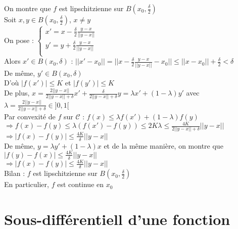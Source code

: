 \documentclass[12pt,a4paper]{article}
\begin{document}
On montre que $f$ est lipschitzienne sur $B(x_0, \frac{\delta}{2})$\\
Soit $x, y \in B(x_0, \frac{\delta}{2})$, $x \neq y$\\

On pose :
$\begin{cases}
    x' = x - \frac{\delta}{2} \frac{y - x}{||y - x||}\\
    y' = y + \frac{\delta}{2} \frac{y - x}{||y - x||}\\
\end{cases}$\\

Alors $x' \in B(x_0, \delta)$ : $||x' - x_0|| = ||x - \frac{\delta}{2} \frac{y - x}{||y - x||} - x_0|| \leq ||x - x_0|| + \frac{\delta}{2} < \delta$\\
De même, $y' \in B(x_0, \delta)$\\

D'où $|f(x')| \leq K$ et $|f(y')| \leq K$\\

De plus, $x = \frac{2 ||y - x||}{2 ||y - x|| + \delta} x' + \frac{\delta}{2 ||y - x|| + \delta} y = \lambda x' + (1 - \lambda) y'$ avec $\lambda = \frac{2 ||y - x||}{2 ||y - x|| + \delta} \in ]0, 1[$\\

Par convexité de $f$ sur $\mathcal{C}$ : $f(x) \leq \lambda f(x') + (1 - \lambda) f(y)$\\
$\Rightarrow f(x) - f(y) \leq \lambda (f(x') - f(y)) \leq 2K\lambda \leq \frac{4K}{2 ||y - x|| + \delta} ||y - x||$\\
$\Rightarrow |f(x) - f(y)| \leq \frac{4K}{\delta} ||y - x||$\\

De même, $y = \lambda y' + (1 - \lambda) x$ et de la même manière, on montre que $|f(y) - f(x)| \leq \frac{4K}{\delta} ||y - x||$\\
$\Rightarrow |f(x) - f(y)| \leq \frac{4K}{\delta} ||y - x||$\\

Bilan : $f$ est lipschitzienne sur $B(x_0, \frac{\delta}{2})$\\
En particulier, $f$ est continue en $x_0$\\

\color{black}

\section{Sous-différentiell d'une fonction}
\end{document}
